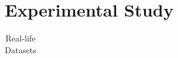 \section{Experimental Study}
\label{sec-expt}


\begin{table}[t!]
\begin{center}
\caption{Real-life Datasets}\label{tab-datasets}
\vspace{-2ex}
\begin{tabular}{|c||c|c|c|}%
\hline



\end{tabular}
\end{center}
\end{table}

